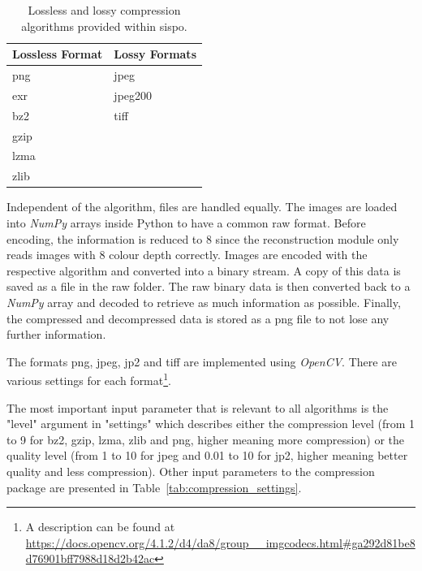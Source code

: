 \begin{table}[htb]
    \centering
    \caption{Lossless and lossy compression algorithms provided within \gls{sispo}.}
    \label{tab:compression_format}
    \begin{tabular}{l|l}
        \textbf{Lossless Format} & \textbf{Lossy Formats} \\ \hline
        \gls{png}              & \gls{jpeg}           \\
        exr               & jpeg200        \\
        bz2               & tiff           \\
        gzip              &                \\
        lzma              &                \\
        zlib              &               
    \end{tabular}
\end{table}

Independent of the algorithm, files are handled equally. The images are loaded into \textit{NumPy} arrays inside Python to have a common raw format. Before encoding, the information is reduced to \SI{8}{\bit} since the reconstruction module only reads images with \SI{8}{\bit} colour depth correctly. Images are encoded with the respective algorithm and converted into a binary stream. A copy of this data is saved as a file in the raw folder. The raw binary data is then converted back to a \textit{NumPy} array and decoded to retrieve as much information as possible. Finally, the compressed and decompressed data is stored as a \gls{png} file to not lose any further information.

The formats \gls{png}, \gls{jpeg}, \gls{jp2} and tiff are implemented using \textit{OpenCV}. There are various settings for each format\footnote{A description can be found at \url{https://docs.opencv.org/4.1.2/d4/da8/group__imgcodecs.html\#ga292d81be8d76901bff7988d18d2b42ac}}.

The most important input parameter that is relevant to all algorithms is the "level" argument in "settings" which describes either the compression level (from 1 to 9 for bz2, gzip, lzma, zlib and \gls{png}, higher meaning more compression) or the quality level (from 1 to 10 for \gls{jpeg} and 0.01 to 10 for \gls{jp2}, higher meaning better quality and less compression). Other input parameters to the compression package are presented in Table~\ref{tab:compression_settings}.

